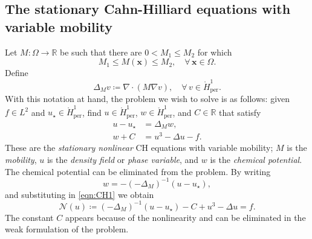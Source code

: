 \documentclass{amsart}
\newcommand{\polR}{\mathbb R}
\newcommand{\bfx}{\boldsymbol{x}}
\newcommand{\Homz}{{\mathring{H}_{\mathrm{per}}^{1}}}
\newcommand{\lapm}{{\Delta_M}}
\newcommand{\RR}{\mathbb{R}}
\theoremstyle{definition}
\begin{document}
\subsection{The stationary Cahn-Hilliard equations with variable mobility}

Let $M : \Omega \to \RR$ be such that there are $0 <M_1 \leq M_2$ for which
\begin{equation}\label{est:mob-bd}
	M_1 \le M(\bfx) \le M_2 , \quad \forall \, \bfx \in \Omega.
\end{equation}
Define
\[
  \Delta_M v \coloneqq  \nabla\cdot\left(M \nabla v \right), \quad \forall \, v\in
\Homz.    
\]
With this notation at hand, the problem we wish to solve is as follows: given $f\in L^2$ and $u_\star\in\Homz$, find  $u\in\Homz$, $w\in\Homz$, and $C\in\polR$ that satisfy
\begin{align}
	u - u_\star & = \Delta_M w,
	\label{eqn:CH1}
	\\
	w + C & = u^3 - \Delta u - f .
	\label{eqn:CH2}
\end{align}
These are the \emph{stationary nonlinear} CH equations with variable mobility; $M$ is the \emph{mobility}, $u$ is the \emph{density field} or \emph{phase variable}, and $w$ is the \emph{chemical potential}. The chemical potential can be eliminated from the problem. By writing
\[
w = -(-\Delta_M)^{-1}\left(u-u_\star\right),
\]
and substituting in \eqref{eqn:CH1} we obtain
\begin{equation}
	\mathcal{N}(u) \coloneqq  (-\Delta_M)^{-1}\left(u - u_\star\right)-C + u^3 - \Delta u  = f.
	\label{eqn:CH3}
\end{equation}
The constant $C$ appears because of the nonlinearity and can be eliminated in the weak formulation of the problem. 
\end{document}

